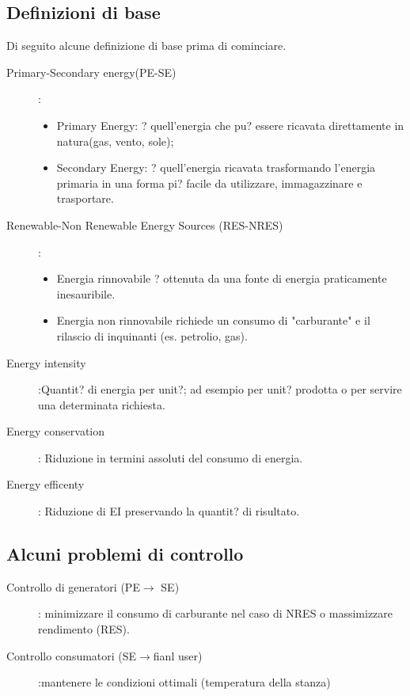 \subsection{Definizioni di base}
Di seguito alcune definizione di base prima di cominciare.
\begin{description}
\item[Primary-Secondary energy(PE-SE)]:
\begin{itemize}
\item Primary Energy: ? quell'energia che pu? essere ricavata direttamente in natura(gas, vento, sole);
\item Secondary Energy: ? quell'energia ricavata trasformando l'energia primaria in una forma pi? facile da utilizzare, immagazzinare e trasportare.
\end{itemize}
\item[Renewable-Non Renewable Energy Sources (RES-NRES)]:
\begin{itemize}
\item Energia rinnovabile ? ottenuta da una fonte di energia praticamente inesauribile.
\item Energia non rinnovabile richiede un consumo di "carburante" e il rilascio di inquinanti (es. petrolio, gas).
\end{itemize}
\item[Energy intensity]:Quantit? di energia per unit?; ad esempio per unit? prodotta o per servire una determinata richiesta.
\item[Energy conservation]: Riduzione in termini assoluti del consumo di energia.
\item[Energy efficenty]: Riduzione di EI preservando la quantit? di risultato.
\end{description}

\subsection{Alcuni problemi di controllo}
\begin{description}
\item[Controllo di generatori (PE$\rightarrow$ SE)]: minimizzare il consumo di carburante nel caso di NRES o massimizzare rendimento (RES).
\item[Controllo consumatori (SE$\rightarrow$fianl user)]:mantenere le condizioni ottimali (temperatura della stanza)
\end{description}
